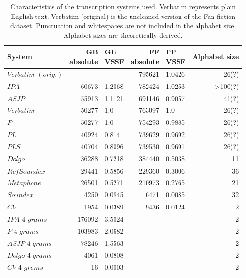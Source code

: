 \begin{table}
\caption{Characteristics of the transcription systems used. Verbatim represents plain English text. Verbatim (original) is the uncleaned version of the Fan-fiction dataset. Punctuation and whitespaces are not included in the alphabet size. Alphabet sizes are theoretically derived.}
\label{tab:system_characteristics}
\centering\small
\begin{tabular}{@{}l@{\hspace{1\tabcolsep}}rlrlr@{}} %
\toprule
\bf System & \bf \specialcell{GB\\absolute} & \bf \specialcell{GB\\VSSF} & \bf \specialcell{FF\\absolute} & \bf \specialcell{FF\\VSSF} & \bf Alphabet size \\
\midrule
$Verbatim$ $(orig.)$ & -- & -- & 795621 & 1.0426 & 26(?) \\
$IPA$ & 60673 & 1.2068 & 782424 & 1.0253 & >100(?) \\
$ASJP$ & 55913 & 1.1121 & 691146 & 0.9057 & 41(?) \\
$Verbatim$ & 50277 & 1.0 & 763097 & 1.0 & 26(?) \\
$P$ & 50277 & 1.0 & 754293 & 0.9885 & 26(?) \\
$PL$ & 40924 & 0.814 & 739629 & 0.9692 & 26(?) \\
$PLS$ & 40704 & 0.8096 & 739530 & 0.9691 & 26(?) \\
$Dolgo$ & 36288 & 0.7218 & 384440 & 0.5038 & 11 \\
$RefSoundex$ & 29441 & 0.5856 & 229360 & 0.3006 & 36 \\
$Metaphone$ & 26501 & 0.5271 & 210973 & 0.2765 & 21 \\
$Soundex$ & 4250 & 0.0845 & 6471 & 0.0085 & 32 \\
$CV$ & 1954 & 0.0389 & 9436 & 0.0124 & 2 \\
$IPA$ $4$-$grams$ & 176092 & 3.5024 & -- & -- & 2 \\
$P$ $4$-$grams$ & 103983 & 2.0682 & -- & -- & 2 \\
$ASJP$ $4$-$grams$ & 78246 & 1.5563 & -- & -- & 2 \\
$Dolgo$ $4$-$grams$ & 4061 & 0.0808 & -- & -- & 2 \\
$CV$ $4$-$grams$ & 16 & 0.0003 & -- & -- & 2 \\
\bottomrule
\end{tabular}
\end{table}

